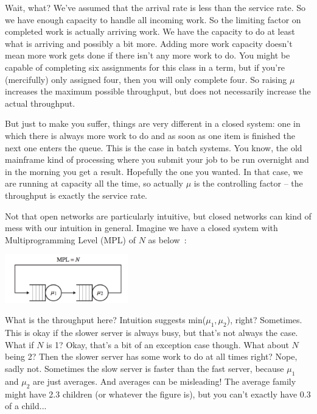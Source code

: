 \documentclass[a4paper]{report}
\begin{document}
Wait, what? We've assumed that the arrival rate is less than the service rate. So we have enough capacity to handle all incoming work. So the limiting factor on completed work is actually arriving work. We have the capacity to do at least what is arriving and possibly a bit more. Adding more work capacity doesn't mean more work gets done if there isn't any more work to do. You might be capable of completing six assignments for this class in a term, but if you're (mercifully) only assigned four, then you will only complete four. So raising $\mu$ increases the maximum possible throughput, but does not necessarily increase the actual throughput.

But just to make you suffer, things are very different in a closed system: one in which there is always more work to do and as soon as one item is finished the next one enters the queue. This is the case in batch systems. You know, the old mainframe kind of processing where you submit your job to be run overnight and in the morning you get a result. Hopefully the one you wanted. In that case, we are running at capacity all the time, so actually $\mu$ is the controlling factor -- the throughput is exactly the service rate. 

Not that open networks are particularly intuitive, but closed networks can kind of mess with our intuition in general. Imagine we have a closed system with Multiprogramming Level (MPL) of $N$ as below~\cite{pmd}:

\begin{center}
	\includegraphics[width=0.4\textwidth]{images/tandem-closed.png}
\end{center}

What is the throughput here? Intuition suggests min($\mu_{1}, \mu_{2}$), right? Sometimes. This is okay if the slower server is always busy, but that's not always the case. What if $N$ is 1? Okay, that's a bit of an exception case though. What about $N$ being 2? Then the slower server has some work to do at all times right? Nope, sadly not. Sometimes the slow server is faster than the fast server, because $\mu_{1}$ and $\mu_{2}$ are just averages. And averages can be misleading! The average family might have 2.3 children (or whatever the figure is), but you can't exactly have 0.3 of a child...
\end{document}
